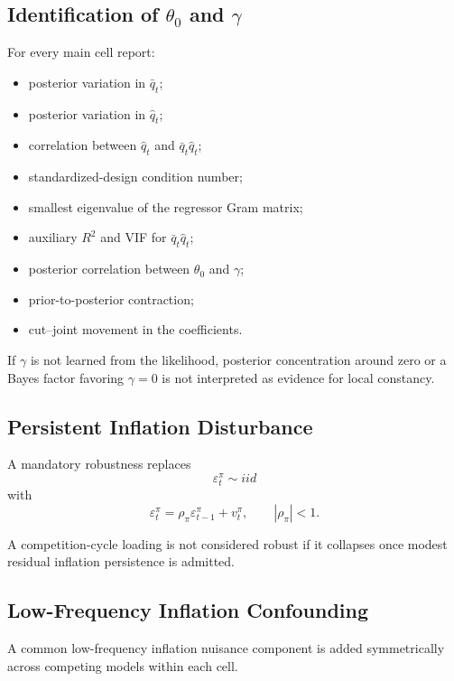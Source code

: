 \documentclass[11pt]{article}
\begin{document}
\subsection{Identification of \(\theta_0\) and \(\gamma\)}

For every main cell report:
\begin{itemize}
\item posterior variation in \(\bar q_t\);
\item posterior variation in \(\hat q_t\);
\item correlation between \(\hat q_t\) and \(\bar q_t\hat q_t\);
\item standardized-design condition number;
\item smallest eigenvalue of the regressor Gram matrix;
\item auxiliary \(R^2\) and VIF for \(\bar q_t\hat q_t\);
\item posterior correlation between \(\theta_0\) and \(\gamma\);
\item prior-to-posterior contraction;
\item cut--joint movement in the coefficients.
\end{itemize}

If \(\gamma\) is not learned from the likelihood, posterior concentration around zero or a Bayes factor favoring \(\gamma=0\) is not interpreted as evidence for local constancy.

\subsection{Persistent Inflation Disturbance}

A mandatory robustness replaces
\begin{equation}
\varepsilon_t^\pi
\sim iid
\end{equation}
with
\begin{equation}
\varepsilon_t^\pi
=
\rho_\pi\varepsilon_{t-1}^\pi+v_t^\pi,
\qquad |\rho_\pi|<1.
\end{equation}

A competition-cycle loading is not considered robust if it collapses once modest residual inflation persistence is admitted.

\subsection{Low-Frequency Inflation Confounding}

A common low-frequency inflation nuisance component is added symmetrically across competing models within each cell.
\end{document}
